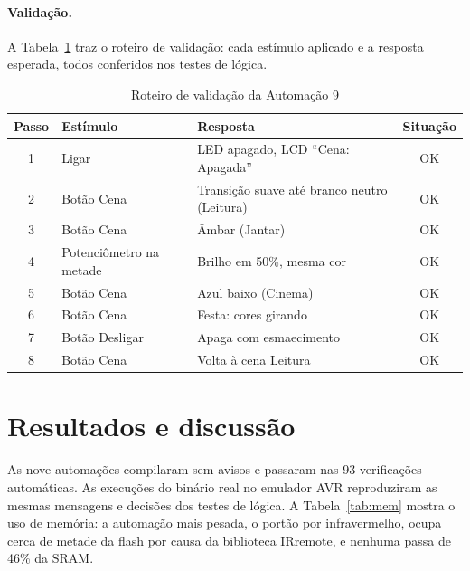 \documentclass[12pt]{article}
\begin{document}
\paragraph{Validação.} A Tabela~\ref{tab:val9} traz o roteiro de validação: cada estímulo aplicado e a resposta esperada, todos conferidos nos testes de lógica.

\begin{table}[ht]
\centering
\caption{Roteiro de validação da Automação 9}\label{tab:val9}
\footnotesize
\begin{tabularx}{\textwidth}{cXXc}
\toprule
Passo & Estímulo & Resposta & Situação \\
\midrule
1 & Ligar & LED apagado, LCD ``Cena: Apagada'' & OK \\
2 & Botão Cena & Transição suave até branco neutro (Leitura) & OK \\
3 & Botão Cena & Âmbar (Jantar) & OK \\
4 & Potenciômetro na metade & Brilho em 50\%, mesma cor & OK \\
5 & Botão Cena & Azul baixo (Cinema) & OK \\
6 & Botão Cena & Festa: cores girando & OK \\
7 & Botão Desligar & Apaga com esmaecimento & OK \\
8 & Botão Cena & Volta à cena Leitura & OK \\
\bottomrule
\end{tabularx}
\end{table}

\section{Resultados e discussão}\label{sec:result}

As nove automações compilaram sem avisos e passaram nas 93 verificações automáticas. As execuções do binário real no emulador AVR reproduziram as mesmas mensagens e decisões dos testes de lógica. A Tabela~\ref{tab:mem} mostra o uso de memória: a automação mais pesada, o portão por infravermelho, ocupa cerca de metade da flash por causa da biblioteca IRremote, e nenhuma passa de 46\% da SRAM.
\end{document}
